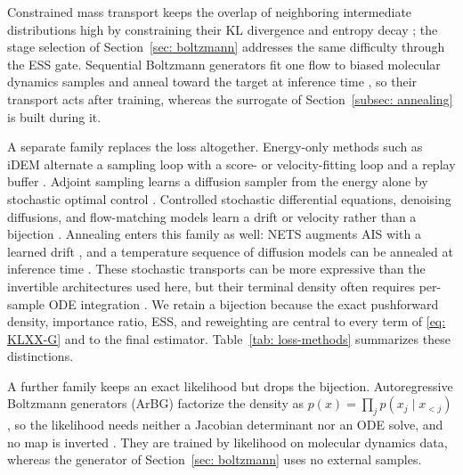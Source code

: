 \documentclass{article}
\begin{document}
Constrained mass transport keeps the overlap of neighboring intermediate distributions high by constraining their KL divergence and entropy decay \citep{vonklitzing2026constrained}; the stage selection of Section~\ref{sec: boltzmann} addresses the same difficulty through the ESS gate. Sequential Boltzmann generators fit one flow to biased molecular dynamics samples and anneal toward the target at inference time \citep{tan2025sequential}, so their transport acts after training, whereas the surrogate of Section~\ref{subsec: annealing} is built during it.

A separate family replaces the loss altogether. Energy-only methods such as iDEM alternate a sampling loop with a score- or velocity-fitting loop and a replay buffer \citep{akhound2024iterated,woo2024iefm}. Adjoint sampling learns a diffusion sampler from the energy alone by stochastic optimal control \citep{havens2025adjoint}. Controlled stochastic differential equations, denoising diffusions, and flow-matching models learn a drift or velocity rather than a bijection \citep{zhang2022path,vargas2023denoising,berner2024optimal,nusken2021solving,richter2024improved}. Annealing enters this family as well: NETS augments AIS with a learned drift \citep{albergo2024nets}, and a temperature sequence of diffusion models can be annealed at inference time \citep{akhoundsadegh2025progressive}. These stochastic transports can be more expressive than the invertible architectures used here, but their terminal density often requires per-sample ODE integration \citep{he2025notrick}. We retain a bijection because the exact pushforward density, importance ratio, ESS, and reweighting are central to every term of \eqref{eq: KLXX-G} and to the final estimator. Table~\ref{tab: loss-methods} summarizes these distinctions.

A further family keeps an exact likelihood but drops the bijection. Autoregressive Boltzmann generators (ArBG) factorize the density as $p(x)=\prod_j p(x_j\mid x_{<j})$, so the likelihood needs neither a Jacobian determinant nor an ODE solve, and no map is inverted \citep{rehman2026autoregressive}. They are trained by likelihood on molecular dynamics data, whereas the generator of Section~\ref{sec: boltzmann} uses no external samples.
\end{document}
